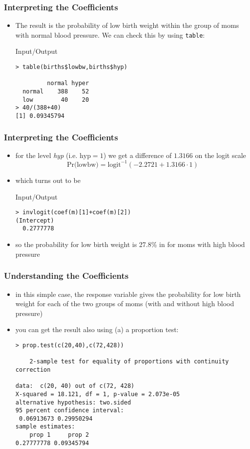 \begin{frame}[fragile]\frametitle{Interpreting the Coefficients}
\begin{itemize}
\item The result is the probability of low birth weight within the group of moms with normal blood pressure. We can check this by using \texttt{table}:
  \begin{exampleblock}{Input/Output}
\begin{verbatim}
> table(births$lowbw,births$hyp)
        
         normal hyper
  normal    388    52
  low        40    20
> 40/(388+40)
[1] 0.09345794
\end{verbatim}
  \end{exampleblock}
\end{itemize}
\end{frame}

\begin{frame}[fragile]\frametitle{Interpreting the Coefficients}
\begin{itemize}
\item for the level \emph{hyp} (i.e. $\mbox{hyp}=1$) we get a difference of $1.3166$ on the logit scale $$\mbox{Pr(lowbw)}=\mbox{logit}^{-1}(-2.2721 + 1.3166 \cdot 1) $$
\item which turns out to be
  \begin{exampleblock}{Input/Output}
\begin{verbatim}
> invlogit(coef(m)[1]+coef(m)[2])
(Intercept) 
  0.2777778 
\end{verbatim}
  \end{exampleblock}
\item so the probability for low birth weight is 27.8\% in for moms with high blood pressure
\end{itemize}
\end{frame}

\begin{frame}[fragile]\frametitle{Understanding the Coefficients}
\begin{itemize}
\item in this simple case, the response variable gives the probability for low birth weight for each of the two groups of moms (with and without high blood pressure)
\item you can get the result also using (a) a proportion test:\small
  \begin{exampleblock}\scriptsize
\begin{verbatim}
> prop.test(c(20,40),c(72,428))

	2-sample test for equality of proportions with continuity correction

data:  c(20, 40) out of c(72, 428)
X-squared = 18.121, df = 1, p-value = 2.073e-05
alternative hypothesis: two.sided
95 percent confidence interval:
 0.06913673 0.29950294
sample estimates:
    prop 1     prop 2 
0.27777778 0.09345794 
\end{verbatim}
  \end{exampleblock}
\end{itemize}
\end{frame}

